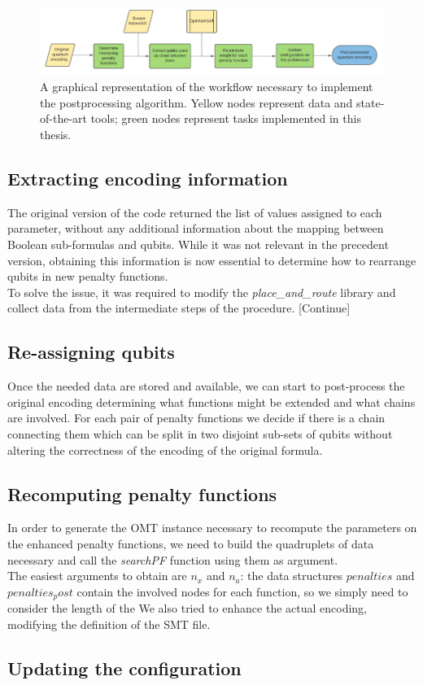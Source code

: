 \begin{figure}[t]
	\begin{center}
	\includegraphics[width=\textwidth]{images/Workflow.png}
	\caption{A graphical representation of the workflow necessary to implement the postprocessing algorithm. Yellow nodes represent data and state-of-the-art tools; green nodes represent tasks implemented in this thesis.}
	\end{center}
\end{figure}

\subsection{Extracting encoding information}

The original version of the code returned the list of values assigned to each parameter, without any additional information about the mapping between Boolean sub-formulas and qubits. While it was not relevant in the precedent version, obtaining this information is now essential to determine how to rearrange qubits in new penalty functions. \\
To solve the issue, it was required to modify the \textit{place\_and\_route} library and collect data from the intermediate steps of the procedure. [Continue]

\subsection{Re-assigning qubits}

Once the needed data are stored and available, we can start to post-process the original encoding determining what functions might be extended and what chains are involved. For each pair of penalty functions we decide if there is a chain connecting them which can be split in two disjoint sub-sets of qubits without altering the correctness of the encoding of the original formula.

\subsection{Recomputing penalty functions}

In order to generate the OMT instance necessary to recompute the parameters on the enhanced penalty functions, we need to build the quadruplets of data necessary and call the \textit{searchPF} function using them as argument.\\
The easiest arguments to obtain are $n_x$ and $n_a$: the data structures $penalties$ and $penalties_post$ contain the involved nodes for each function, so we simply need to consider the length of the 
We also tried to enhance the actual encoding, modifying the definition of the SMT file. 

\subsection{Updating the configuration}

\newpage

